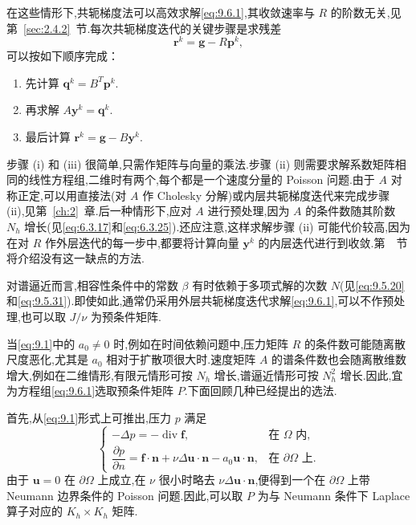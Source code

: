 在这些情形下,共轭梯度法可以高效求解\eqref{eq:9.6.1},其收敛速率与 \(R\) 的阶数无关,见第~\ref{sec:2.4.2}~节.每次共轭梯度迭代的关键步骤是求残差
\[
  \boldsymbol{r}^k=\boldsymbol{g}-R\boldsymbol{p}^k,
\]
可以按如下顺序完成：
\begin{enumerate}[label=(\roman*)]
  \item 先计算 \(\boldsymbol{q}^k=B^T\boldsymbol{p}^k\).
  \item 再求解 \(A\boldsymbol{y}^k=\boldsymbol{q}^k\).
  \item 最后计算 \(\boldsymbol{r}^k=\boldsymbol{g}-B\boldsymbol{y}^k\).
\end{enumerate}
步骤 (i) 和 (iii) 很简单,只需作矩阵与向量的乘法.步骤 (ii) 则需要求解系数矩阵相同的线性方程组,二维时有两个,每个都是一个速度分量的 Poisson 问题.由于 \(A\) 对称正定,可以用直接法(对 \(A\) 作 Cholesky 分解)或内层共轭梯度迭代来完成步骤 (ii),见第~\ref{ch:2}~章.后一种情形下,应对 \(A\) 进行预处理,因为 \(A\) 的条件数随其阶数 \(N_h\) 增长(见\eqref{eq:6.3.17}和\eqref{eq:6.3.25}).还应注意,这样求解步骤 (ii) 可能代价较高,因为在对 \(R\) 作外层迭代的每一步中,都要将计算向量 \(\boldsymbol{y}^k\) 的内层迭代进行到收敛.第~~节将介绍没有这一缺点的方法.

对谱逼近而言,相容性条件中的常数 \(\beta\) 有时依赖于多项式解的次数 \(N\)(见\eqref{eq:9.5.20}和\eqref{eq:9.5.31}).即使如此,通常仍采用外层共轭梯度迭代求解\eqref{eq:9.6.1},可以不作预处理,也可以取 \(J/\nu\) 为预条件矩阵.

当\eqref{eq:9.1}中的 \(a_0\ne0\) 时,例如在时间依赖问题中,压力矩阵 \(R\) 的条件数可能随离散尺度恶化,尤其是 \(a_0\) 相对于扩散项很大时.速度矩阵 \(A\) 的谱条件数也会随离散维数增大,例如在二维情形,有限元情形可按 \(N_h\) 增长,谱逼近情形可按 \(N_h^2\) 增长.因此,宜为方程组\eqref{eq:9.6.1}选取预条件矩阵 \(P\).下面回顾几种已经提出的选法.

首先,从\eqref{eq:9.1}形式上可推出,压力 \(p\) 满足
\[
  \begin{cases}
    -\Delta p=-\operatorname{div}\boldsymbol{f},&\text{在 }\Omega\text{ 内},\\
    \dfrac{\partial p}{\partial n}
      =\boldsymbol{f}\cdot\boldsymbol{n}+\nu\Delta\boldsymbol{u}\cdot\boldsymbol{n}
        -a_0\boldsymbol{u}\cdot\boldsymbol{n},&\text{在 }\partial\Omega\text{ 上}.
  \end{cases}
\]
由于 \(\boldsymbol{u}=0\) 在 \(\partial\Omega\) 上成立,在 \(\nu\) 很小时略去 \(\nu\Delta\boldsymbol{u}\cdot\boldsymbol{n}\),便得到一个在 \(\partial\Omega\) 上带 Neumann 边界条件的 Poisson 问题.因此,可以取 \(P\) 为与 Neumann 条件下 Laplace 算子对应的 \(K_h\times K_h\) 矩阵.

